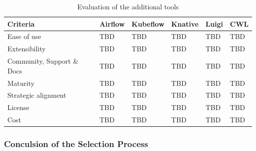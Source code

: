 \begin{table}[htb]
    \centering
    \begin{tabular}{|l|l|l|l|l|l|} \hline
        \textbf{Criteria}                                          & \textbf{Airflow}      & \textbf{Kubeflow}     & \textbf{Knative}      & \textbf{Luigi}        & \textbf{CWL}          \\ \hline
        Ease of use                                                & TBD                   & TBD                   & TBD                   & TBD                   & TBD                   \\ \hline
        Extensibility                                              & TBD                   & TBD                   & TBD                   & TBD                   & TBD                   \\ \hline
        Community, Support \& Docs                                 & TBD                   & TBD                   & TBD                   & TBD                   & TBD                   \\ \hline
        Maturity                                                   & TBD                   & TBD                   & TBD                   & TBD                   & TBD                   \\ \hline
        Strategic alignment                                        & TBD                   & TBD                   & TBD                   & TBD                   & TBD                   \\ \hline
        License                                                    & TBD                   & TBD                   & TBD                   & TBD                   & TBD                   \\ \hline
        Cost                                                       & TBD                   & TBD                   & TBD                   & TBD                   & TBD                   \\ \hline

    \end{tabular}
    \caption{Evaluation of the additional tools}
    \label{tab:evaluation_of_the_additional_tools}
\end{table}

\subsubsection{Conculsion of the Selection Process}

\blindtext[1]


